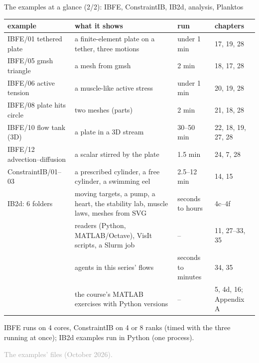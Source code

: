 \documentclass[aspectratio=169,11pt]{beamer}
\newcommand{\sourcecredit}[1]{\vfill\begin{flushright}\tiny\textcolor{DarkGray}{#1}\end{flushright}}
\begin{document}
\begin{frame}{The examples at a glance (2/2): IBFE, ConstraintIB, IB2d, analysis, Planktos}
\label{fr:glance2}
\scriptsize
\renewcommand{\arraystretch}{0.95}
\begin{tabular}{@{}L{0.26\textwidth}L{0.39\textwidth}L{0.11\textwidth}L{0.14\textwidth}@{}}
\toprule
example & what it shows & run & chapters \\
\midrule
IBFE/01 tethered plate & a finite-element plate on a tether, three motions & under 1 min & 17, 19, 28 \\
IBFE/05 gmsh triangle & a mesh from gmsh & 2 min & 18, 17, 28 \\
IBFE/06 active tension & a muscle-like active stress & under 1 min & 20, 19, 28 \\
IBFE/08 plate hits circle & two meshes (parts) & 2 min & 21, 18, 28 \\
IBFE/10 flow tank (3D) & a plate in a 3D stream & 30--50 min & 22, 18, 19, 27, 28 \\
IBFE/12 advection--diffusion & a scalar stirred by the plate & 1.5 min & 24, 7, 28 \\
ConstraintIB/01--03 & a prescribed cylinder, a free cylinder, a swimming eel & 2.5--12 min & 14, 15 \\
IB2d: 6 folders & moving targets, a pump, a heart, the stability lab, muscle laws, meshes from SVG & seconds to hours & 4c--4f \\
 & readers (Python, MATLAB/Octave), VisIt scripts, a Slurm job & -- & 11, 27--33, 35 \\
 & agents in this series' flows & seconds to minutes & 34, 35 \\
 & the course's MATLAB exercises with Python versions & -- & 5, 4d, 16; Appendix A \\
\bottomrule
\end{tabular}

\vspace{1mm}
\footnotesize IBFE runs on 4 cores, ConstraintIB on 4 or 8 ranks (timed with the three running at once); IB2d examples run in Python (one process).
\sourcecredit{The examples'  files (October 2026).}
\end{frame}
\end{document}
